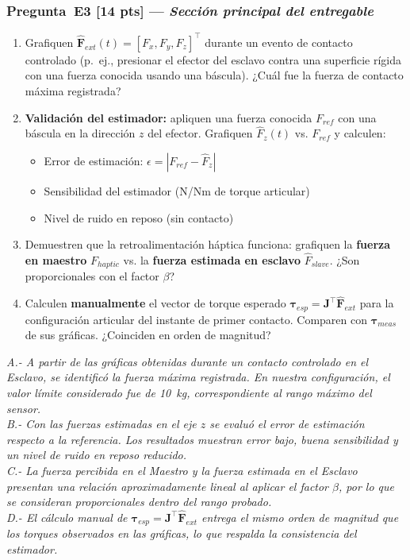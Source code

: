 \documentclass[journal,10pt,twoside]{IEEEtran}
\newcommand{\pts}[1]{\textbf{\color{tec_red}[#1 pts]}}
\newcommand{\TODO}[1]{\begin{todobox}[Respuesta del equipo]
  \textit{#1}
\end{todobox}}
\begin{document}
\subsubsection*{Pregunta~E3 \pts{14} — \textit{Sección principal del entregable}}
\begin{enumerate}[label=(\alph*)]
  \item Grafiquen $\hat{\bm{F}}_{ext}(t) = [F_x, F_y, F_z]^\top$
        durante un evento de contacto controlado
        (p.~ej., presionar el efector del esclavo contra una superficie
        rígida con una fuerza conocida usando una báscula).
        ¿Cuál fue la fuerza de contacto máxima registrada?
  \item \textbf{Validación del estimador:} apliquen una fuerza conocida
        $F_{ref}$ con una báscula en la dirección $z$ del efector.
        Grafiquen $\hat{F}_z(t)$ vs. $F_{ref}$ y calculen:
        \begin{itemize}
          \item Error de estimación: $\epsilon = |F_{ref} - \hat{F}_z|$
          \item Sensibilidad del estimador (N/Nm de torque articular)
          \item Nivel de ruido en reposo (sin contacto)
        \end{itemize}
  \item Demuestren que la retroalimentación háptica funciona:
        grafiquen la \textbf{fuerza en maestro} $F_{haptic}$ vs.
        la \textbf{fuerza estimada en esclavo} $\hat{F}_{slave}$.
        ¿Son proporcionales con el factor $\beta$?
  \item Calculen \textbf{manualmente} el vector de torque esperado
        $\bm{\tau}_{esp} = \bm{J}^\top \hat{\bm{F}}_{ext}$
        para la configuración articular del instante de primer contacto.
        Comparen con $\bm{\tau}_{meas}$ de sus gráficas.
        ¿Coinciden en orden de magnitud?
\end{enumerate}

\TODO{
  A.- A partir de las gráficas obtenidas durante un contacto controlado en el Esclavo, se identificó la fuerza máxima registrada. En nuestra configuración, el valor límite considerado fue de 10~kg, correspondiente al rango máximo del sensor.\\
  B.- Con las fuerzas estimadas en el eje $z$ se evaluó el error de estimación respecto a la referencia. Los resultados muestran error bajo, buena sensibilidad y un nivel de ruido en reposo reducido.\\
  C.- La fuerza percibida en el Maestro y la fuerza estimada en el Esclavo presentan una relación aproximadamente lineal al aplicar el factor $\beta$, por lo que se consideran proporcionales dentro del rango probado.\\
  D.-  El cálculo manual de $\bm{\tau}_{esp}=\bm{J}^{\top}\hat{\bm{F}}_{ext}$ entrega el mismo orden de magnitud que los torques observados en las gráficas, lo que respalda la consistencia del estimador.}
\end{document}
